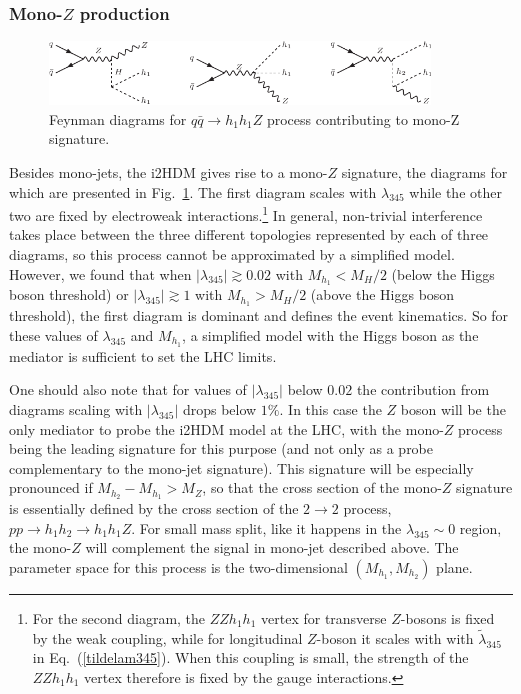 \documentclass[12pt,a4paper]{article}
\begin{document}
\subsubsection{Mono-$Z$ production}

%
\begin{figure}[h!]
\begin{center}
\includegraphics[width=0.9\textwidth]{fd-mono-z.pdf} 
\caption{Feynman diagrams for $q\bar{q}\to h_1 h_1Z$  process 
contributing to mono-Z signature.}
\label{fig:fd-mono-Z}
\end{center}
\end{figure}
%

Besides mono-jets, the i2HDM gives rise to a mono-$Z$ signature, the 
diagrams for which are presented in Fig.~\ref{fig:fd-mono-Z}.
The first diagram scales with $\lambda_{345}$ while the other two are fixed by electroweak interactions.\footnote{For the second diagram, the $ZZh_1h_1$ vertex for transverse $Z$-bosons is fixed by the weak coupling,
while for longitudinal $Z$-boson it scales with with $\tilde\lambda_{345}$ in Eq.~(\ref{tildelam345}). 
When this coupling is small, the strength of the  $ZZh_1h_1$ vertex therefore
is fixed by the gauge interactions.}
In general, non-trivial interference takes place between the three different topologies represented by each of three 
diagrams, so  this process cannot be approximated by a simplified model.
However, we found that when $|\lambda_{345}|\gtrsim 0.02$ with $M_{h_1}< M_H/2$ (below the Higgs boson threshold)
or $|\lambda_{345}|\gtrsim 1$ with $M_{h_1}> M_H/2$ (above the Higgs boson threshold),
the first diagram is dominant and defines the event kinematics. 
So for these values of $\lambda_{345}$ and $M_{h_1}$, a simplified
model with the Higgs boson as the mediator is sufficient to set the LHC limits.

One should also note that for values of $|\lambda_{345}|$
below $0.02$ the contribution from diagrams scaling with $|\lambda_{345}|$
drops below $1\%$. In this case the
$Z$ boson will be the only mediator to probe the i2HDM model at the LHC,
with the mono-$Z$ process being the leading signature
for this purpose (and not only as a probe complementary to the mono-jet signature). 
This signature will be especially pronounced if $M_{h_2}-M_{h_1} > M_Z$,
so that the cross section of the mono-$Z$ signature
is essentially defined by the cross section of the $2 \to 2$ process,
$pp\to h_1 h_2 \to h_1 h_1 Z$.
For small mass split, like it happens in the $\lambda_{345} \sim 0$ region, the mono-$Z$ will complement the signal in mono-jet described above.
The parameter space for this process is
the two-dimensional $(M_{h_1},M_{h_2})$ plane.
\end{document}

